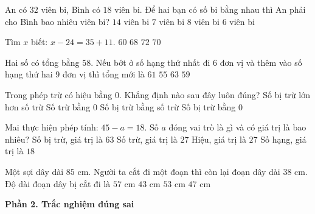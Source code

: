 \begin{ex} %
An có $32$ viên bi, Bình có $18$ viên bi. Để hai bạn có số bi bằng nhau thì An phải cho Bình bao nhiêu viên bi?
\choice
{$14$ viên bi}
{\True $7$ viên bi}
{$8$ viên bi}
{$6$ viên bi}
\end{ex}

\begin{ex} %
Tìm $x$ biết: $x - 24 = 35 + 11$.
\choice
{$60$}
{$68$}
{$72$}
{\True $70$}
\end{ex}

\begin{ex} %
Hai số có tổng bằng $58$. Nếu bớt ở số hạng thứ nhất đi $6$ đơn vị và thêm vào số hạng thứ hai $9$ đơn vị thì tổng mới là
\choice
{\True $61$}
{$55$}
{$63$}
{$59$}
\end{ex}

\begin{ex} %
Trong phép trừ có hiệu bằng $0$. Khẳng định nào sau đây luôn đúng?
\choice
{Số bị trừ lớn hơn số trừ}
{Số trừ bằng $0$}
{\True Số bị trừ bằng số trừ}
{Số bị trừ bằng $0$}
\end{ex}

\begin{ex} %
Mai thực hiện phép tính: $45 - a = 18$. Số $a$ đóng vai trò là gì và có giá trị là bao nhiêu?
\choice
{Số bị trừ, giá trị là $63$}
{\True Số trừ, giá trị là $27$}
{Hiệu, giá trị là $27$}
{Số hạng, giá trị là $18$}
\end{ex}

\begin{ex} %
Một sợi dây dài $85\text{ cm}$. Người ta cắt đi một đoạn thì còn lại đoạn dây dài $38\text{ cm}$. Độ dài đoạn dây bị cắt đi là
\choice
{$57\text{ cm}$}
{$43\text{ cm}$}
{$53\text{ cm}$}
{\True $47\text{ cm}$}
\end{ex}

\textbf{Phần 2. Trắc nghiệm đúng sai}

